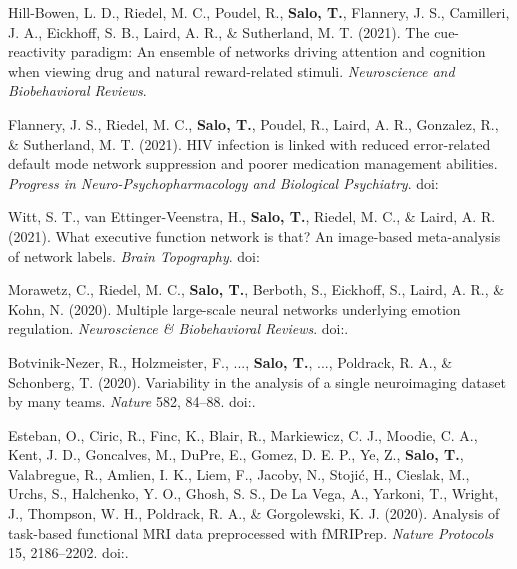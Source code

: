 \documentclass[10pt]{article}
\newcommand{\textlink}[3][blue]{\href{#2}{\color{#1}{#3}}}
\begin{document}
\begin{hangparas}{.25in}{1}

	Hill-Bowen, L. D., Riedel, M. C., Poudel, R., \textbf{Salo, T.}, Flannery, J. S.,
	Camilleri, J. A., Eickhoff, S. B., Laird, A. R., \& Sutherland, M. T. (2021).
	The cue-reactivity paradigm: An ensemble of networks driving attention and cognition
	when viewing drug and natural reward-related stimuli.
	\emph{Neuroscience and Biobehavioral Reviews}.

	\bigskip

	Flannery, J. S., Riedel, M. C., \textbf{Salo, T.}, Poudel, R., Laird, A. R.,
	Gonzalez, R., \& Sutherland, M. T. (2021).
	HIV infection is linked with reduced error-related default mode network suppression and poorer
	medication management abilities.
	\emph{Progress in Neuro-Psychopharmacology and Biological Psychiatry}.
	doi:\textlink{https://doi.org/10.1016/j.pnpbp.2021.110398}{10.1016/j.pnpbp.2021.110398}

	\bigskip

	Witt, S. T., van Ettinger-Veenstra, H., \textbf{Salo, T.}, Riedel, M. C., \& Laird, A. R. (2021).
    What executive function network is that? An image-based meta-analysis of network labels.
    \emph{Brain Topography}.
    doi:\textlink{https://doi.org/10.1007/s10548-021-00847-z}{10.1007/s10548-021-00847-z}

	\bigskip

    Morawetz, C., Riedel, M. C., \textbf{Salo, T.}, Berboth, S.,
    Eickhoff, S., Laird, A. R., \& Kohn, N. (2020).
    Multiple large-scale neural networks underlying emotion regulation.
    \emph{Neuroscience \& Biobehavioral Reviews}.
    doi:\textlink{https://doi.org/10.1016/j.neubiorev.2020.07.001}{10.1016/j.neubiorev.2020.07.001}.

    \bigskip

	Botvinik-Nezer, R., Holzmeister, F., ..., \textbf{Salo, T.}, ...,
	Poldrack, R. A., \& Schonberg, T. (2020).
	Variability in the analysis of a single neuroimaging dataset by many teams.
	\emph{Nature} 582, 84–88.
    doi:\textlink{https://doi.org/10.1038/s41586-020-2314-9}{10.1038/s41586-020-2314-9}.

	\bigskip

	Esteban, O., Ciric, R., Finc, K., Blair, R., Markiewicz, C. J.,
	Moodie, C. A., Kent, J. D., Goncalves, M., DuPre, E., Gomez, D. E. P.,
	Ye, Z., \textbf{Salo, T.}, Valabregue, R., Amlien, I. K., Liem, F.,
	Jacoby, N., Stojić, H., Cieslak, M., Urchs, S., Halchenko, Y. O.,
	Ghosh, S. S., De La Vega, A., Yarkoni, T., Wright, J., Thompson, W. H.,
	Poldrack, R. A., \& Gorgolewski, K. J. (2020).
	Analysis of task-based functional MRI data preprocessed with fMRIPrep.
	\emph{Nature Protocols} 15, 2186–2202.
 	doi:\textlink{https://doi.org/10.1038/s41596-020-0327-3}{10.1038/s41596-020-0327-3}.


\end{hangparas}
\end{document}
